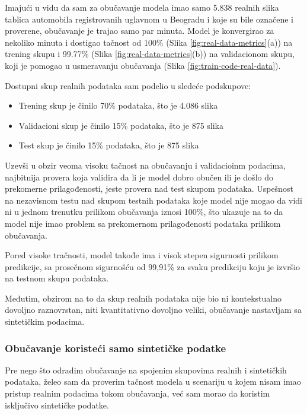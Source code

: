 \documentclass[a4paper,12pt]{article}
\begin{document}
	Imajući u vidu da sam za obučavanje modela imao samo 5.838 realnih slika tablica automobila registrovanih uglavnom u Beogradu i koje su bile označene i proverene, obučavanje je trajao samo par minuta. Model je konvergirao za nekoliko minuta i dostigao tačnost od 100\% (Slika \ref{fig:real-data-metrics}(a)) na trening skupu i 99.77\% (Slika \ref{fig:real-data-metrics}(b)) na validacionom skupu, koji je pomogao u usmeravanju obučavanja (Slika \ref{fig:train-code-real-data}).\newline
	
	Dostupni skup realnih podataka sam podelio u sledeće podskupove:
	\begin{itemize}
		\item Trening skup je činilo 70\% podataka, što je 4.086 slika
		\item Validacioni skup je činilo 15\% podataka, što je 875 slika
		\item Test skup je činilo 15\% podataka, što je 875 slika
	\end{itemize}
	
	Uzevši u obzir veoma visoku tačnost na obučavanju i validacioinm podacima, najbitnija provera koja validira da li je model dobro obučen ili je došlo do prekomerne prilagođenosti, jeste provera nad test skupom podataka. Uspešnost na nezavisnom testu nad skupom testnih podataka koje model nije mogao da vidi ni u jednom trenutku prilikom obučavanja iznosi 100\%, što ukazuje na to da model nije imao problem sa prekomernom prilagođenosti podataka prilikom obučavanja.
	
	Pored visoke tračnosti, model takođe ima i visok stepen sigurnosti prilikom predikcije, sa prosečnom sigurnošću od 99,91\% za svaku predikciju koju je izvršio na testnom skupu podataka.
	
	Međutim, obzirom na to da skup realnih podataka nije bio ni kontekstualno dovoljno raznovrstan, niti kvantitativno dovoljno veliki, obučavanje nastavljam sa sintetičkim podacima.
	
	\subsubsection{Obučavanje koristeći samo sintetičke podatke}
	Pre nego što odradim obučavanje na spojenim skupovima realnih i sintetičkih podataka, želeo sam da proverim tačnost modela u scenariju u kojem nisam imao pristup realnim podacima tokom obučavanja, već sam morao da koristim isključivo sintetičke podatke.
	
\end{document}
